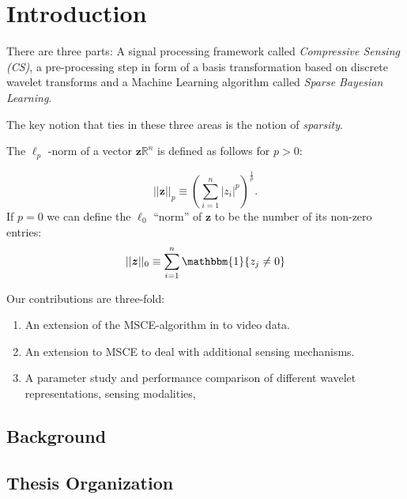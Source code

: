 \chapter{Introduction}

There are three parts: A signal processing framework called \emph{Compressive Sensing (CS)}, a pre-processing step in form of a basis transformation based on discrete wavelet transforms and a Machine Learning algorithm called \emph{Sparse Bayesian Learning}.

The key notion that ties in these three areas is the notion of \emph{sparsity}.

The $\ell_p$ -norm of a vector $\bm z \mathbb{R}^n$ is defined as follows for $p>0$:

\begin{equation}
\label{eqn:lp-norm}
  ||\bm z||_p \equiv \left( \sum_{i=1}^n |z_i|^p \right)^\frac{1}{p}.
\end{equation}
If $p=0$ we can define the $\ell_0$ ``norm'' of $\bm z$ to be the number of its non-zero entries:
\begin{equation}
\label{eqn:l0-norm}
  ||\bm z||_0 \equiv  \sum_{i=1}^n \mathbbm{1}\{z_j \neq 0\}
\end{equation}


Our contributions are three-fold:
\begin{enumerate}
\item An extension of the MSCE-algorithm in \cite{pilikos2014} to video data.
\item An extension to MSCE to deal with additional sensing mechanisms.
\item A parameter study and performance comparison of different wavelet representations, sensing modalities, 
\end{enumerate}


\section*{Background}
\section*{Thesis Organization}
